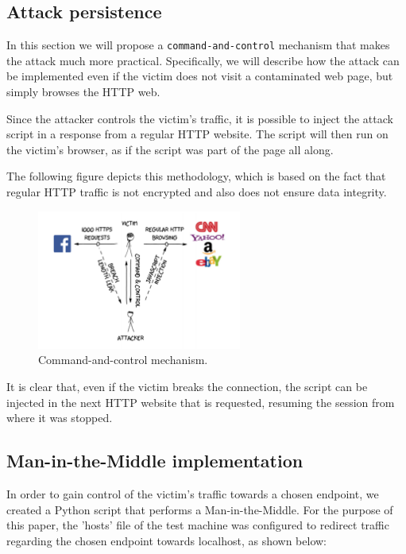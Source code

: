 \subsection{Attack persistence}\label{sec:persistence}

In this section we will propose a \texttt{command-and-control} mechanism that
makes the attack much more practical. Specifically, we will describe how the
attack can be implemented even if the victim does not visit a contaminated web
page, but simply browses the HTTP web.

Since the attacker controls the victim's traffic, it is possible to inject the
attack script in a response from a regular HTTP website. The script will then
run on the victim's browser, as if the script was part of the page all along.

The following figure depicts this methodology, which is based on the fact that
regular HTTP traffic is not encrypted and also does not ensure data integrity.

\begin{figure}[H] \caption{Command-and-control mechanism.} \centering
\includegraphics[width=0.6\textwidth]{diagrams/breach_mitm.png}\end{figure}

It is clear that, even if the victim breaks the connection, the script can be
injected in the next HTTP website that is requested, resuming the session from
where it was stopped.

\subsection{Man-in-the-Middle implementation}

In order to gain control of the victim's traffic towards a chosen endpoint, we
created a Python script that performs a Man-in-the-Middle. For the purpose of
this paper, the 'hosts' file of the test machine was configured to redirect
traffic regarding the chosen endpoint towards localhost, as shown below:

